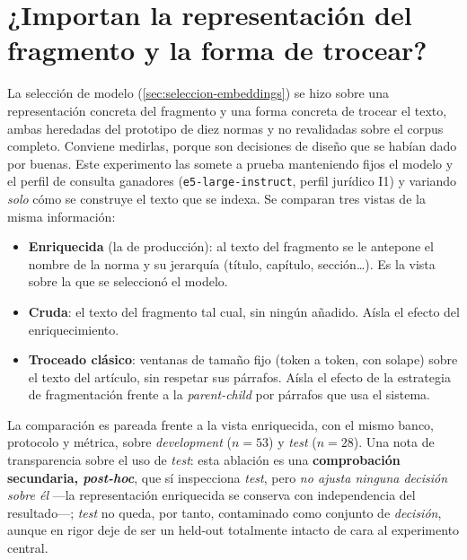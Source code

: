 \section{¿Importan la representación del fragmento y la forma de trocear?}
\label{sec:ablacion-representacion}

La selección de modelo (\ref{sec:seleccion-embeddings}) se hizo sobre una representación concreta del fragmento y una forma concreta de trocear el texto, ambas heredadas del prototipo de diez normas y no revalidadas sobre el corpus completo. Conviene medirlas, porque son decisiones de diseño que se habían dado por buenas. Este experimento las somete a prueba manteniendo fijos el modelo y el perfil de consulta ganadores (\texttt{e5-large-instruct}, perfil jurídico I1) y variando \emph{solo} cómo se construye el texto que se indexa. Se comparan tres vistas de la misma información:

\begin{itemize}
  \item \textbf{Enriquecida} (la de producción): al texto del fragmento se le antepone el nombre de la norma y su jerarquía (título, capítulo, sección\ldots). Es la vista sobre la que se seleccionó el modelo.
  \item \textbf{Cruda}: el texto del fragmento tal cual, sin ningún añadido. Aísla el efecto del enriquecimiento.
  \item \textbf{Troceado clásico}: ventanas de tamaño fijo (token a token, con solape) sobre el texto del artículo, sin respetar sus párrafos. Aísla el efecto de la estrategia de fragmentación frente a la \emph{parent-child} por párrafos que usa el sistema.
\end{itemize}

La comparación es pareada frente a la vista enriquecida, con el mismo banco, protocolo y métrica, sobre \emph{development} ($n=53$) y \emph{test} ($n=28$). Una nota de transparencia sobre el uso de \emph{test}: esta ablación es una \textbf{comprobación secundaria, \emph{post-hoc}}, que sí inspecciona \emph{test}, pero \emph{no ajusta ninguna decisión sobre él} —la representación enriquecida se conserva con independencia del resultado—; \emph{test} no queda, por tanto, contaminado como conjunto de \emph{decisión}, aunque en rigor deje de ser un held-out totalmente intacto de cara al experimento central.

